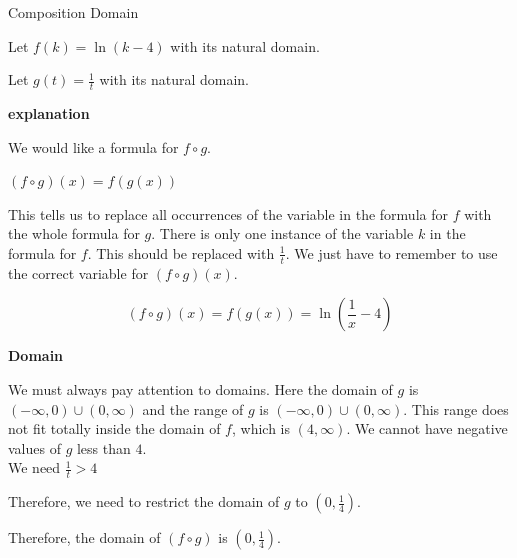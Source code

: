 \documentclass{ximera}
\begin{document}
\begin{example} Composition Domain


Let $f(k) = \ln(k - 4)$ with its natural domain.


Let $g(t) = \frac{1}{t}$ with its natural domain.



\textbf{\textcolor{red!75!green}{explanation}} 

We would like a formula for $f \circ g$. 

$(f \circ g)(x) = f(g(x))$ 

This tells us to replace all occurrences of the variable in the formula for $f$ with the whole formula for $g$.  There is only one instance of the variable $k$ in the formula for $f$.  This should be replaced with $\frac{1}{t}$. We just have to remember to use the correct variable for $(f \circ g)(x)$. 



\[
(f \circ g)(x) = f(g(x)) = \ln\left( \frac{1}{x} - 4 \right)
\]








\begin{observation} \textbf{\textcolor{-red!75}{Domain}}


We must always pay attention to domains.  Here the domain of $g$ is $(-\infty, 0) \cup (0, \infty)$ and the range of $g$ is $(-\infty, 0) \cup (0, \infty)$.  This range does not fit totally inside the domain of $f$, which is $(4, \infty)$.  We cannot have negative values of $g$ less than $4$.  \\


We need $\frac{1}{t} > 4$

Therefore, we need to restrict the domain of $g$ to $\left(0, \frac{1}{4} \right)$.



Therefore, the domain of $(f \circ g)$ is $\left(0, \frac{1}{4} \right)$.

\end{observation}



\end{example}
\end{document}
